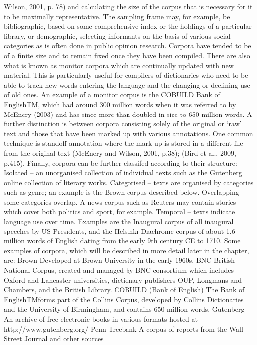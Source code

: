 Wilson, 2001, p. 78) and calculating the size of the corpus that is necessary for it to
be maximally representative. The sampling frame may, for example, be bibliographic,
based on some comprehensive index or the holdings of a particular library, or
demographic, selecting informants on the basis of various social categories as is often
done in public opinion research.
Corpora have tended to be of a finite size and to remain fixed once they have been
compiled. There are also what is known as monitor corpora which are continually
updated with new material. This is particularly useful for compilers of dictionaries
who need to be able to track new words entering the language and the changing or
declining use of old ones. An example of a monitor corpus is the COBUILD Bank of
EnglishTM, which had around 300 million words when it was referred to by McEnery
(2003) and has since more than doubled in size to 650 million words.
A further distinction is between corpora consisting solely of the original or ‘raw’ text
and those that have been marked up with various annotations. One common
technique is standoff annotation where the mark-up is stored in a different file from
the original text (McEnery and Wilson, 2001, p.38); (Bird et al., 2009, p.415).
Finally, corpora can be further classifed according to their structure:
Isolated – an unorganised collection of individual texts such as the Gutenberg
online collection of literary works.
Categorised – texts are organised by categories such as genre; an example is the
Brown corpus described below.
Overlapping – some categories overlap. A news corpus such as Reuters may contain
stories which cover both politics and sport, for example.
Temporal – texts indicate language use over time. Examples are the Inaugural
corpus of all inaugural speeches by US Presidents, and the Helsinki Diachronic
corpus of about 1.6 million words of English dating from the early 9th century
CE to 1710.
Some examples of corpora, which will be described in more detail later in the
chapter, are:
Brown Developed at Brown University in the early 1960s.
BNC British National Corpus, created and managed by BNC consortium which
includes Oxford and Lancaster universities, dictionary publishers OUP,
Longmans and Chambers, and the British Library.
COBUILD (Bank of English) The Bank of EnglishTMforms part of the Collins
Corpus, developed by Collins Dictionaries and the University of Birmingham,
and contains 650 million words.
Gutenberg An archive of free electronic books in various formats hosted at
http://www.gutenberg.org/
Penn Treebank A corpus of reports from the Wall Street Journal and other sources
